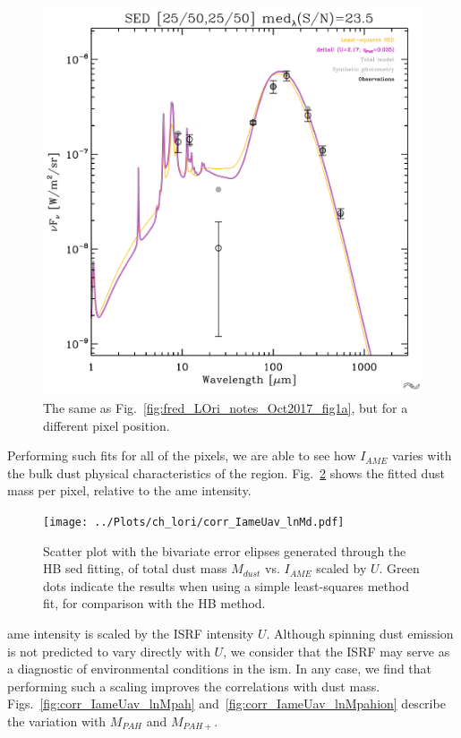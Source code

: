               \begin{figure}
                \includegraphics[width=\textwidth]{../Plots/ch_lori/fred_LOri_notes_Oct2017_fig1b.pdf}
                \centering
                \caption{The same as Fig.~\ref{fig:fred_LOri_notes_Oct2017_fig1a}, but for a different pixel position.}
                \label{fig:fred_LOri_notes_Oct2017_fig1b}
              \end{figure}
           Performing such fits for all of the pixels, we are able to see how $I_{AME}$ varies with the bulk dust physical characteristics of the region. Fig.~\ref{fig:corr_IameUav_lnMd} shows the fitted dust mass per pixel, relative to the \acrshort{ame} intensity.
                \begin{figure}
                 \texttt{[image: ../Plots/ch\_lori/corr\_IameUav\_lnMd.pdf]}
                 \centering
                 \caption{Scatter plot with the bivariate error elipses generated through the HB \acrshort{sed} fitting, of total dust mass $M_{dust}$ vs. $I_{AME}$ scaled by $U$. Green dots indicate the results when using a simple least-squares method fit, for comparison with the HB method.}
                 \label{fig:corr_IameUav_lnMd}
               \end{figure}
           \acrshort{ame} intensity is scaled by the ISRF intensity $U$. Although spinning dust emission is not predicted to vary directly with $U$, we consider that the ISRF may serve as a diagnostic of environmental conditions in the \acrshort{ism}. In any case, we find that performing such a scaling improves the correlations with dust mass.   Figs.~\ref{fig:corr_IameUav_lnMpah} and~\ref{fig:corr_IameUav_lnMpahion} describe the variation with $M_{PAH}$ and $M_{PAH+}$.

